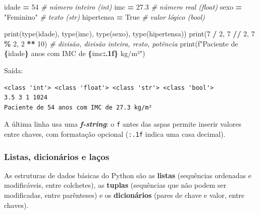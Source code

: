 \documentclass[
]{book}
\newenvironment{Shaded}{\begin{snugshade}}{\end{snugshade}}
\newcommand{\BuiltInTok}[1]{#1}
\newcommand{\CommentTok}[1]{\textcolor[rgb]{0.56,0.35,0.01}{\textit{#1}}}
\newcommand{\DecValTok}[1]{\textcolor[rgb]{0.00,0.00,0.81}{#1}}
\newcommand{\FloatTok}[1]{\textcolor[rgb]{0.00,0.00,0.81}{#1}}
\newcommand{\NormalTok}[1]{#1}
\newcommand{\OperatorTok}[1]{\textcolor[rgb]{0.81,0.36,0.00}{\textbf{#1}}}
\newcommand{\SpecialCharTok}[1]{\textcolor[rgb]{0.81,0.36,0.00}{\textbf{#1}}}
\newcommand{\SpecialStringTok}[1]{\textcolor[rgb]{0.31,0.60,0.02}{#1}}
\newcommand{\StringTok}[1]{\textcolor[rgb]{0.31,0.60,0.02}{#1}}
\newcommand{\VariableTok}[1]{\textcolor[rgb]{0.00,0.00,0.00}{#1}}
\begin{document}
\begin{Shaded}
\begin{Highlighting}[]
\NormalTok{idade }\OperatorTok{=} \DecValTok{54}                  \CommentTok{\# número inteiro (int)}
\NormalTok{imc }\OperatorTok{=} \FloatTok{27.3}                  \CommentTok{\# número real (float)}
\NormalTok{sexo }\OperatorTok{=} \StringTok{"Feminino"}           \CommentTok{\# texto (str)}
\NormalTok{hipertensa }\OperatorTok{=} \VariableTok{True}           \CommentTok{\# valor lógico (bool)}

\BuiltInTok{print}\NormalTok{(}\BuiltInTok{type}\NormalTok{(idade), }\BuiltInTok{type}\NormalTok{(imc), }\BuiltInTok{type}\NormalTok{(sexo), }\BuiltInTok{type}\NormalTok{(hipertensa))}
\BuiltInTok{print}\NormalTok{(}\DecValTok{7} \OperatorTok{/} \DecValTok{2}\NormalTok{, }\DecValTok{7} \OperatorTok{//} \DecValTok{2}\NormalTok{, }\DecValTok{7} \OperatorTok{\%} \DecValTok{2}\NormalTok{, }\DecValTok{2} \OperatorTok{**} \DecValTok{10}\NormalTok{)   }\CommentTok{\# divisão, divisão inteira, resto, potência}
\BuiltInTok{print}\NormalTok{(}\SpecialStringTok{f"Paciente de }\SpecialCharTok{\{}\NormalTok{idade}\SpecialCharTok{\}}\SpecialStringTok{ anos com IMC de }\SpecialCharTok{\{}\NormalTok{imc}\SpecialCharTok{:.1f\}}\SpecialStringTok{ kg/m²"}\NormalTok{)}
\end{Highlighting}
\end{Shaded}

Saída:

\begin{verbatim}
<class 'int'> <class 'float'> <class 'str'> <class 'bool'>
3.5 3 1 1024
Paciente de 54 anos com IMC de 27.3 kg/m²
\end{verbatim}

A última linha usa uma \textbf{\emph{f-string}}: o \texttt{f} antes das aspas permite inserir valores entre chaves, com formatação opcional (\texttt{:.1f} indica uma casa decimal).

\subsubsection{Listas, dicionários e laços}\label{listas-dicionuxe1rios-e-lauxe7os}

As estruturas de dados básicas do Python são as \textbf{listas} (sequências ordenadas e modificáveis, entre colchetes), as \textbf{tuplas} (sequências que não podem ser modificadas, entre parênteses) e os \textbf{dicionários} (pares de chave e valor, entre chaves).
\end{document}
